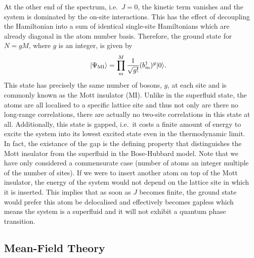 At the other end of the spectrum, i.e.~$J = 0$, the kinetic term
vanishes and the system is dominated by the on-site interactions. This
has the effect of decoupling the Hamiltonian into a sum of identical
single-site Hamiltonians which are already diagonal in the atom number
basis. Therefore, the ground state for $N = gM$, where $g$ is an
integer, is given by
\begin{equation}
  \label{eq:GSMI}
  | \Psi_\mathrm{MI} \rangle = \prod_m^M \frac{1} {\sqrt{g!}}
  (b^\dagger_m)^g | 0 \rangle.
\end{equation}
This state has precisely the same number of bosons, $g$, at each site
and is commonly known as the Mott insulator (MI). Unlike in the
superfluid state, the atoms are all localised to a specific lattice
site and thus not only are there no long-range correlations, there are
actually no two-site correlations in this state at all. Additionally,
this state is gapped, i.e.~it costs a finite amount of energy to
excite the system into its lowest excited state even in the
thermodynamic limit. In fact, the existance of the gap is the defining
property that distinguishes the Mott insulator from the superfluid in
the Bose-Hubbard model. Note that we have only considered a
commensurate case (number of atoms an integer multiple of the number
of sites). If we were to insert another atom on top of the Mott
insulator, the energy of the system would not depend on the lattice
site in which it is inserted. This implies that as soon as $J$ becomes
finite, the ground state would prefer this atom be delocalised and
effectively becomes gapless which means the system is a superfluid and
it will not exhibit a quantum phase transition.

\subsection{Mean-Field Theory}

